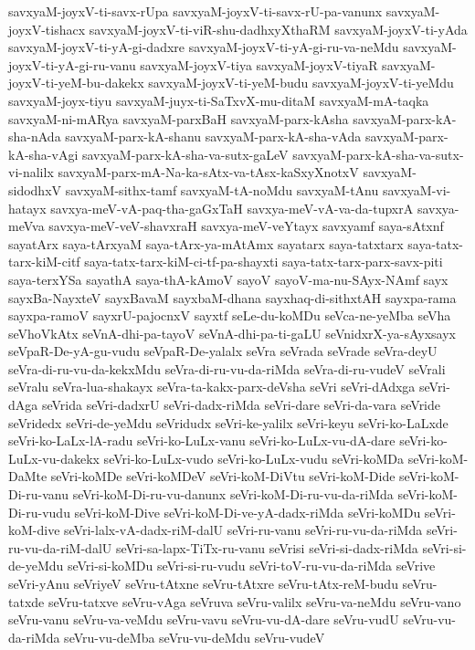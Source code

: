 {savxyaM-joyxV-ti-savx-rUpa
savxyaM-joyxV-ti-savx-rU-pa-vanunx
savxyaM-joyxV-tishacx
savxyaM-joyxV-ti-viR-shu-dadhxyXthaRM
savxyaM-joyxV-ti-yAda
savxyaM-joyxV-ti-yA-gi-dadxre
savxyaM-joyxV-ti-yA-gi-ru-va-neMdu
savxyaM-joyxV-ti-yA-gi-ru-vanu
savxyaM-joyxV-tiya
savxyaM-joyxV-tiyaR
savxyaM-joyxV-ti-yeM-bu-dakekx
savxyaM-joyxV-ti-yeM-budu
savxyaM-joyxV-ti-yeMdu
savxyaM-joyx-tiyu
savxyaM-juyx-ti-SaTxvX-mu-ditaM
savxyaM-mA-taqka
savxyaM-ni-mARya
savxyaM-parxBaH
savxyaM-parx-kAsha
savxyaM-parx-kA-sha-nAda
savxyaM-parx-kA-shanu
savxyaM-parx-kA-sha-vAda
savxyaM-parx-kA-sha-vAgi
savxyaM-parx-kA-sha-va-sutx-gaLeV
savxyaM-parx-kA-sha-va-sutx-vi-nalilx
savxyaM-parx-mA-Na-ka-sAtx-va-tAsx-kaSxyXnotxV
savxyaM-sidodhxV
savxyaM-sithx-tamf
savxyaM-tA-noMdu
savxyaM-tAnu
savxyaM-vi-hatayx
savxya-meV-vA-paq-tha-gaGxTaH
savxya-meV-vA-va-da-tupxrA
savxya-meVva
savxya-meV-veV-shavxraH
savxya-meV-veYtayx
savxyamf
saya-sAtxnf
sayatArx
saya-tArxyaM
saya-tArx-ya-mAtAmx
sayatarx
saya-tatxtarx
saya-tatx-tarx-kiM-citf
saya-tatx-tarx-kiM-ci-tf-pa-shayxti
saya-tatx-tarx-parx-savx-piti
saya-terxYSa
sayathA
saya-thA-kAmoV
sayoV
sayoV-ma-nu-SAyx-NAmf
sayx
sayxBa-NayxteV
sayxBavaM
sayxbaM-dhana
sayxhaq-di-sithxtAH
sayxpa-rama
sayxpa-ramoV
sayxrU-pajocnxV
sayxtf
seLe-du-koMDu
seVca-ne-yeMba
seVha
seVhoVkAtx
seVnA-dhi-pa-tayoV
seVnA-dhi-pa-ti-gaLU
seVnidxrX-ya-sAyxsayx
seVpaR-De-yA-gu-vudu
seVpaR-De-yalalx
seVra
seVrada
seVrade
seVra-deyU
seVra-di-ru-vu-da-kekxMdu
seVra-di-ru-vu-da-riMda
seVra-di-ru-vudeV
seVrali
seVralu
seVra-lua-shakayx
seVra-ta-kakx-parx-deVsha
seVri
seVri-dAdxga
seVri-dAga
seVrida
seVri-dadxrU
seVri-dadx-riMda
seVri-dare
seVri-da-vara
seVride
seVridedx
seVri-de-yeMdu
seVridudx
seVri-ke-yalilx
seVri-keyu
seVri-ko-LaLxde
seVri-ko-LaLx-lA-radu
seVri-ko-LuLx-vanu
seVri-ko-LuLx-vu-dA-dare
seVri-ko-LuLx-vu-dakekx
seVri-ko-LuLx-vudo
seVri-ko-LuLx-vudu
seVri-koMDa
seVri-koM-DaMte
seVri-koMDe
seVri-koMDeV
seVri-koM-DiVtu
seVri-koM-Dide
seVri-koM-Di-ru-vanu
seVri-koM-Di-ru-vu-danunx
seVri-koM-Di-ru-vu-da-riMda
seVri-koM-Di-ru-vudu
seVri-koM-Dive
seVri-koM-Di-ve-yA-dadx-riMda
seVri-koMDu
seVri-koM-dive
seVri-lalx-vA-dadx-riM-dalU
seVri-ru-vanu
seVri-ru-vu-da-riMda
seVri-ru-vu-da-riM-dalU
seVri-sa-lapx-TiTx-ru-vanu
seVrisi
seVri-si-dadx-riMda
seVri-si-de-yeMdu
seVri-si-koMDu
seVri-si-ru-vudu
seVri-toV-ru-vu-da-riMda
seVrive
seVri-yAnu
seVriyeV
seVru-tAtxne
seVru-tAtxre
seVru-tAtx-reM-budu
seVru-tatxde
seVru-tatxve
seVru-vAga
seVruva
seVru-valilx
seVru-va-neMdu
seVru-vano
seVru-vanu
seVru-va-veMdu
seVru-vavu
seVru-vu-dA-dare
seVru-vudU
seVru-vu-da-riMda
seVru-vu-deMba
seVru-vu-deMdu
seVru-vudeV
}
